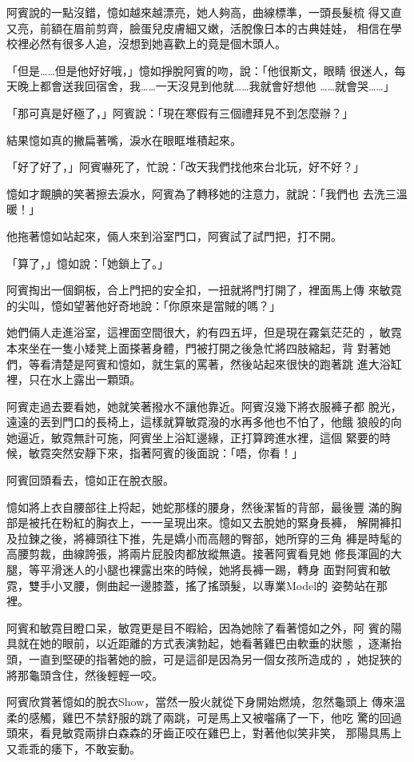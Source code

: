 阿賓說的一點沒錯，憶如越來越漂亮，她人夠高，曲線標準，一頭長髮梳
得又直又亮，前額在眉前剪齊，臉蛋兒皮膚細又嫩，活脫像日本的古典娃娃，
相信在學校裡必然有很多人追，沒想到她喜歡上的竟是個木頭人。

「但是……但是他好好哦，」憶如掙脫阿賓的吻，說：「他很斯文，眼睛
很迷人，每天晚上都會送我回宿舍，我……一天沒見到他就……我就會好想他
……就會哭……」

「那可真是好極了，」阿賓說：「現在寒假有三個禮拜見不到怎麼辦？」

結果憶如真的撇扁著嘴，淚水在眼眶堆積起來。

「好了好了，」阿賓嚇死了，忙說：「改天我們找他來台北玩，好不好？」

憶如才靦腆的笑著擦去淚水，阿賓為了轉移她的注意力，就說：「我們也
去洗三溫暖！」

他拖著憶如站起來，倆人來到浴室門口，阿賓試了試門把，打不開。

「算了，」憶如說：「她鎖上了。」

阿賓掏出一個銅板，合上門把的安全扣，一扭就將門打開了，裡面馬上傳
來敏霓的尖叫，憶如望著他好奇地說：「你原來是當賊的嗎？」

她們倆人走進浴室，這裡面空間很大，約有四五坪，但是現在霧氣茫茫的
，敏霓本來坐在一隻小矮凳上面搽著身體，門被打開之後急忙將四肢縮起，背
對著她們，等看清楚是阿賓和憶如，就生氣的罵著，然後站起來很快的跑著跳
進大浴缸裡，只在水上露出一顆頭。

阿賓走過去要看她，她就笑著撥水不讓他靠近。阿賓沒幾下將衣服褲子都
脫光，遠遠的丟到門口的長椅上，這樣就算敏霓潑的水再多他也不怕了，他餓
狼般的向她逼近，敏霓無計可施，阿賓坐上浴缸邊緣，正打算跨進水裡，這個
緊要的時候，敏霓突然安靜下來，指著阿賓的後面說：「唔，你看！」

阿賓回頭看去，憶如正在脫衣服。

憶如將上衣自腰部往上捋起，她蛇那樣的腰身，然後潔皙的背部，最後豐
滿的胸部是被托在粉紅的胸衣上，一一呈現出來。憶如又去脫她的緊身長褲，
解開褲扣及拉鍊之後，將褲頭往下推，先是嬌小而高翹的臀部，她所穿的三角
褲是時髦的高腰剪裁，曲線誇張，將兩片屁股肉都放縱無遺。接著阿賓看見她
修長渾圓的大腿，等平滑迷人的小腿也裸露出來的時候，她將長褲一踢，轉身
面對阿賓和敏霓，雙手小叉腰，側曲起一邊膝蓋，搖了搖頭髮，以專業Model的
姿勢站在那裡。

阿賓和敏霓目瞪口呆，敏霓更是目不暇給，因為她除了看著憶如之外，阿
賓的陽具就在她的眼前，以近距離的方式表演勃起，她看著雞巴由軟垂的狀態
，逐漸抬頭，一直到堅硬的指著她的臉，可是這卻是因為另一個女孩所造成的
，她捉狹的將那龜頭含住，然後輕輕一咬。

阿賓欣賞著憶如的脫衣Show，當然一股火就從下身開始燃燒，忽然龜頭上
傳來溫柔的感觸，雞巴不禁舒服的跳了兩跳，可是馬上又被囓痛了一下，他吃
驚的回過頭來，看見敏霓兩排白森森的牙齒正咬在雞巴上，對著他似笑非笑，
那陽具馬上又乖乖的痿下，不敢妄動。

